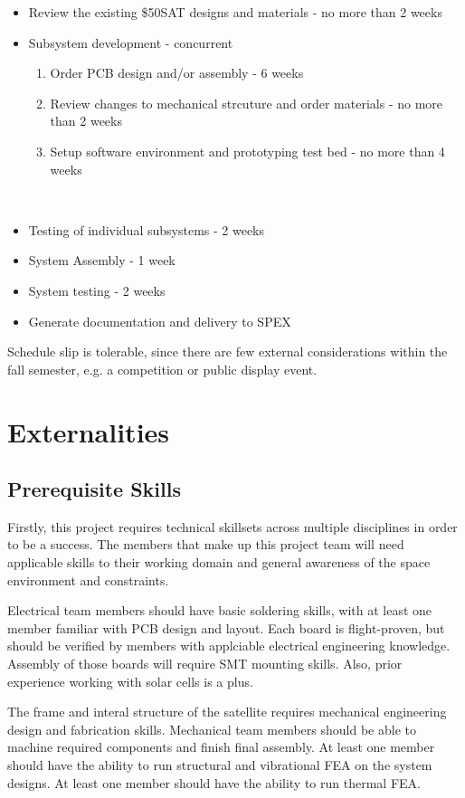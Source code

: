 \documentclass[conference]{IEEEtran} %
\begin{document}
\begin{itemize}
  \item Review the existing \$50SAT designs and materials - no more than 2 weeks
  \item Subsystem development - concurrent
  \begin{enumerate}
    \item Order PCB design and/or assembly - 6 weeks
    \item Review changes to mechanical strcuture and order materials - no more than 2 weeks
    \item Setup software environment and prototyping test bed - no more than 4 weeks
  \end{enumerate}\
  \item Testing of individual subsystems - 2 weeks
  \item System Assembly - 1 week
  \item System testing - 2 weeks
  \item Generate documentation and delivery to SPEX
\end{itemize}

Schedule slip is tolerable, since there are few external considerations within the fall semester, e.g. a competition or public display event.
\section{Externalities}
\subsection{Prerequisite Skills}
Firstly, this project requires technical skillsets across multiple disciplines in order to be a success.
The members that make up this project team will need applicable skills to their working domain and general awareness of the space environment and constraints.

Electrical team members should have basic soldering skills, with at least one member familiar with PCB design and layout.
Each board is flight-proven, but should be verified by members with applciable electrical engineering knowledge.
Assembly of those boards will require SMT mounting skills.
Also, prior experience working with solar cells is a plus.

The frame and interal structure of the satellite requires mechanical engineering design and fabrication skills.
Mechanical team members should be able to machine required components and finish final assembly.
At least one member should have the ability to run structural and vibrational FEA on the system designs.
At least one member should have the ability to run thermal FEA.
\end{document}
